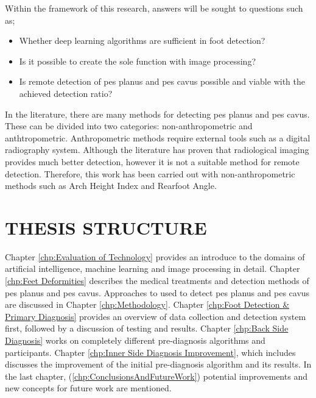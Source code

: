 Within the framework of this research, answers will be sought to questions such as;

\begin{itemize}
  \item Whether deep learning algorithms are sufficient in foot detection?
  \item Is it possible to create the sole function with image processing?
  \item Is remote detection of pes planus and pes cavus possible and viable with the achieved detection ratio?
\end{itemize}

In the literature, there are many methods for detecting pes planus and pes cavus. These can be divided into two categories: non-anthropometric and anthtropometric. Anthropometric methods require external tools such as a digital radiography system. Although the literature has proven that radiological imaging provides much better detection, however it is not a suitable method for remote detection. Therefore, this work has been carried out with non-anthropometric methods such as Arch Height Index and Rearfoot Angle.

\section{THESIS STRUCTURE}

Chapter \ref{chp:Evaluation of Technology} provides an introduce to the domains of artificial intelligence, machine learning and image processing in detail. Chapter \ref{chp:Feet Deformities} describes the medical treatments and detection methods of pes planus and pes cavus. Approaches to used to detect pes planus and pes cavus are discussed in Chapter \ref{chp:Methodology}. Chapter \ref{chp:Foot Detection & Primary Diagnosis} provides an overview of data collection and detection system first, followed by a discussion of testing and results. Chapter \ref{chp:Back Side Diagnosis} works on completely different pre-diagnosis algorithms and participants. Chapter \ref{chp:Inner Side Diagnosis Improvement}, which includes discusses the improvement of the initial pre-diagnosis algorithm and its results. In the last chapter, (\ref{chp:ConclusionsAndFutureWork}) potential improvements and new concepts for future work are mentioned.
